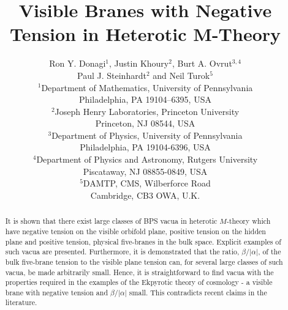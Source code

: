 \documentclass[a4paper,12pt]{article}
\numberwithin{equation}{section}
\newcommand{\ns}{\normalsize}
\theoremstyle{plain}
\begin{document}

\begin{titlepage}

\vspace{-10cm}

\title{
   {\LARGE Visible Branes with Negative Tension in Heterotic M-Theory} \\[1em] } 
\author{
   Ron Y. Donagi$^1$, Justin Khoury$^2$, Burt A. Ovrut$^{3,4}$\\
   Paul J. Steinhardt$^2$ and Neil Turok$^5$\\[0.5cm]
   {\ns $^1$Department of Mathematics, University of Pennsylvania} \\[-0.4em]
   {\ns Philadelphia, PA 19104--6395, USA}\\
   {\ns $^2$Joseph Henry Laboratories, Princeton University} 
   \\[-0.4em]
   {\ns Princeton, NJ 08544, USA}\\ 
   {\ns $^3$Department of Physics, University of Pennsylvania} 
   \\[-0.4em]
   {\ns Philadelphia, PA 19104-6396, USA}\\ 
   {\ns $^4$Department of Physics and Astronomy, Rutgers University} 
   \\[-0.4em]
   {\ns Piscataway, NJ 08855-0849, USA}\\ 
   {\ns $^5$DAMTP, CMS, Wilberforce Road} \\[-0.4em]
   {\ns Cambridge, CB3 OWA, U.K.}\\}
\date{}

\maketitle

\begin{abstract}

It is shown that there exist large classes of BPS vacua in heterotic $M$-theory
which have negative tension on the visible orbifold plane, positive tension on the
hidden plane and positive tension, physical five-branes in the bulk space.
Explicit examples of such vacua are presented. Furthermore, it is
demonstrated that the ratio, $\beta/|\alpha|$, of the bulk five-brane tension 
to the visible plane tension can, for several large classes of such vacua, be made
arbitrarily small. Hence, it is straightforward to find vacua 
with the properties required in the examples of the Ekpyrotic theory of 
cosmology - a visible brane with negative tension and $\beta/|\alpha|$ small. 
This contradicts recent claims in the literature.

 \end{abstract}

\thispagestyle{empty}

\end{titlepage}
\end{document}

